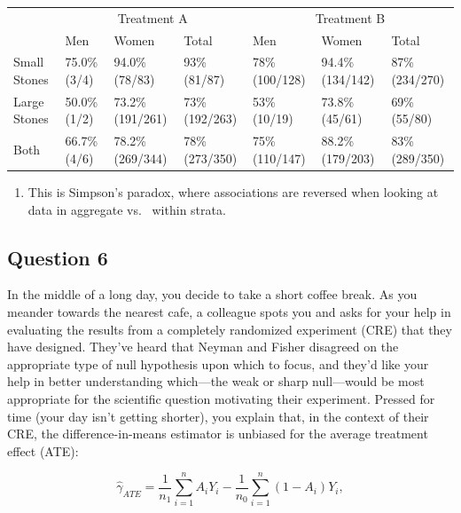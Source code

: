 \documentclass[
  letterpaper,
  DIV=11,
  numbers=noendperiod]{scrartcl}
\providecommand{\tightlist}{%
  \setlength{\itemsep}{0pt}\setlength{\parskip}{0pt}}\usepackage{longtable,booktabs,array}
\begin{document}
\begin{table}
\centering\begingroup\fontsize{9}{11}\selectfont

\begin{tabular}[t]{lllllll}
\toprule
\multicolumn{1}{c}{} & \multicolumn{3}{c}{Treatment A} & \multicolumn{3}{c}{Treatment B} \\
\cmidrule(l{3pt}r{3pt}){2-4} \cmidrule(l{3pt}r{3pt}){5-7}
 & Men & Women & Total & Men & Women & Total\\
\midrule
Small Stones & 75.0\% (3/4) & 94.0\% (78/83) & 93\% (81/87) & 78\% (100/128) & 94.4\% (134/142) & 87\% (234/270)\\
Large Stones & 50.0\% (1/2) & 73.2\% (191/261) & 73\% (192/263) & 53\% (10/19) & 73.8\% (45/61) & 69\% (55/80)\\
Both & 66.7\% (4/6) & 78.2\% (269/344) & 78\% (273/350) & 75\% (110/147) & 88.2\% (179/203) & 83\% (289/350)\\
\bottomrule
\end{tabular}
\endgroup{}
\end{table}

\begin{enumerate}
\def\labelenumi{\alph{enumi})}
\setcounter{enumi}{2}
\tightlist
\item
  This is Simpson's paradox, where associations are reversed when
  looking at data in aggregate vs.~ within strata.
\end{enumerate}

\newpage

\hypertarget{question-6}{%
\subsection{Question 6}\label{question-6}}

In the middle of a long day, you decide to take a short coffee break. As
you meander towards the nearest cafe, a colleague spots you and asks for
your help in evaluating the results from a completely randomized
experiment (CRE) that they have designed. They've heard that Neyman and
Fisher disagreed on the appropriate type of null hypothesis upon which
to focus, and they'd like your help in better understanding which---the
weak or sharp null---would be most appropriate for the scientific
question motivating their experiment. Pressed for time (your day isn't
getting shorter), you explain that, in the context of their CRE, the
difference-in-means estimator is unbiased for the average treatment
effect (ATE):

\[
\hat{\gamma}_{ATE} = \frac{1}{n_1} \sum_{i=1}^{n} A_iY_i - \frac{1}{n_0} \sum_{i=1}^{n}(1 - A_i)Y_i ,
\]
\end{document}
